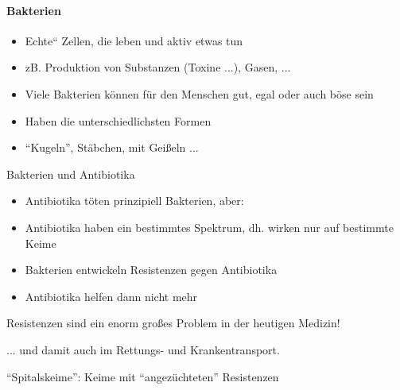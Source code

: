 \documentclass{article}
\begin{document}
\paragraph[Bakterien]{Bakterien}
\begin{itemize}
\item {\quotedblbase}Echte{\textquotedblleft} Zellen, die leben und
aktiv etwas tun

\end{itemize}
\begin{itemize}
\item zB. Produktion von Substanzen (Toxine ...), Gasen, ...

\end{itemize}
\begin{itemize}
\item Viele Bakterien k\"onnen f\"ur den Menschen gut, egal oder auch
b\"ose sein

\item Haben die unterschiedlichsten Formen

\end{itemize}
\begin{itemize}
\item {\textquotedblleft}Kugeln{\textquotedblright}, St\"abchen, mit
Gei{\ss}eln ... 

\end{itemize}
Bakterien und Antibiotika

\begin{itemize}
\item Antibiotika t\"oten prinzipiell Bakterien, aber:

\end{itemize}
\begin{itemize}
\item Antibiotika haben ein bestimmtes Spektrum, dh. wirken nur auf
bestimmte Keime

\item Bakterien entwickeln Resistenzen gegen Antibiotika

\item Antibiotika helfen dann nicht mehr

\end{itemize}
Resistenzen sind ein enorm gro{\ss}es Problem in der heutigen Medizin!

... und damit auch im Rettungs- und Krankentransport.

{\textquotedblleft}Spitalskeime{\textquotedblright}:
Keime mit {\textquotedblleft}angez\"uchteten{\textquotedblright}
Resistenzen
\end{document}
